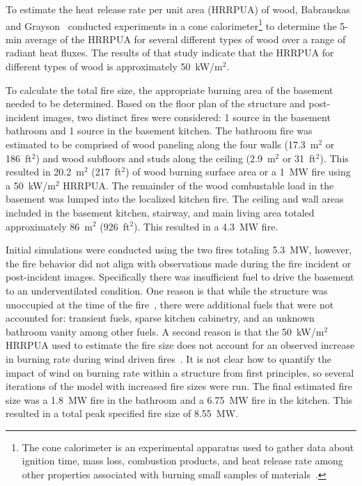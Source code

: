 \documentclass[12pt,oneside]{book}
\begin{document}
To estimate the heat release rate per unit area (HRRPUA) of wood, Babrauskas and Grayson~\cite{babrauskas1990} conducted experiments in a cone calorimeter\footnote{The cone calorimeter is an experimental apparatus used to gather data about ignition time, mass loss, combustion products, and heat release rate among other properties associated with burning small samples of materials~\cite{ASTM:E1355}.} to determine the 5-min average of the HRRPUA for several different types of wood over a range of radiant heat fluxes. The results of that study indicate that the HRRPUA for different types of wood is approximately 50~kW/m$^2$.

To calculate the total fire size, the appropriate burning area of the basement needed to be determined. Based on the floor plan of the structure and post-incident images, two distinct fires were considered: 1 source in the basement bathroom and 1 source in the basement kitchen. The bathroom fire was estimated to be comprised of wood paneling along the four walls (17.3~m$^2$ or 186~ft$^2$) and wood subfloors and studs along the ceiling (2.9~m$^2$ or 31~ft$^2$). This resulted in 20.2~m$^2$ (217~ft$^2$) of wood burning surface area or a 1~MW fire using a 50~kW/m$^2$ HRRPUA. The remainder of the wood combustable load in the basement was lumped into the localized kitchen fire. The ceiling and wall areas included in the basement kitchen, stairway, and main living area totaled approximately 86~m$^2$ (926~ft$^2$). This resulted in a 4.3~MW fire.

Initial simulations were conducted using the two fires totaling 5.3~MW, however, the fire behavior did not align with observations made during the fire incident or post-incident images. Specifically there was insufficient fuel to drive the basement to an underventilated condition. One reason is that while the structure was unoccupied at the time of the fire~\cite{PGCounty2013}, there were additional fuels that were not accounted for: transient fuels, sparse kitchen cabinetry, and an unknown bathroom vanity among other fuels. A second reason is that the 50~kW/m$^2$ HRRPUA used to estimate the fire size does not account for an observed increase in burning rate during wind driven fires~\cite{madrzykowski2009fire,kerber2009fire}. It is not clear how to quantify the impact of wind on burning rate within a structure from first principles, so several iterations of the model with increased fire sizes were run. The final estimated fire size was a 1.8~MW fire in the bathroom and a 6.75~MW fire in the kitchen. This resulted in a total peak specified fire size of 8.55~MW.
\end{document}
